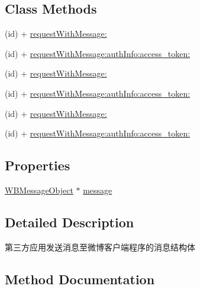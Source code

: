 \subsection*{Class Methods}
\begin{DoxyCompactItemize}
\item 
(id) + \mbox{\hyperlink{interface_w_b_send_message_to_weibo_request_af6ff893011c578e7351d4f35b542fb41}{request\+With\+Message\+:}}
\item 
(id) + \mbox{\hyperlink{interface_w_b_send_message_to_weibo_request_a5e6bfaa6c972f6687d6683a95567d3ce}{request\+With\+Message\+:auth\+Info\+:access\+\_\+token\+:}}
\item 
(id) + \mbox{\hyperlink{interface_w_b_send_message_to_weibo_request_af6ff893011c578e7351d4f35b542fb41}{request\+With\+Message\+:}}
\item 
(id) + \mbox{\hyperlink{interface_w_b_send_message_to_weibo_request_a5e6bfaa6c972f6687d6683a95567d3ce}{request\+With\+Message\+:auth\+Info\+:access\+\_\+token\+:}}
\item 
(id) + \mbox{\hyperlink{interface_w_b_send_message_to_weibo_request_af6ff893011c578e7351d4f35b542fb41}{request\+With\+Message\+:}}
\item 
(id) + \mbox{\hyperlink{interface_w_b_send_message_to_weibo_request_a5e6bfaa6c972f6687d6683a95567d3ce}{request\+With\+Message\+:auth\+Info\+:access\+\_\+token\+:}}
\end{DoxyCompactItemize}
\subsection*{Properties}
\begin{DoxyCompactItemize}
\item 
\mbox{\hyperlink{interface_w_b_message_object}{W\+B\+Message\+Object}} $\ast$ \mbox{\hyperlink{interface_w_b_send_message_to_weibo_request_afccd6e92ccee8d34d39341cc34bbe083}{message}}
\end{DoxyCompactItemize}


\subsection{Detailed Description}
第三方应用发送消息至微博客户端程序的消息结构体 

\subsection{Method Documentation}
\mbox{\label{interface_w_b_send_message_to_weibo_request_af6ff893011c578e7351d4f35b542fb41}} 
